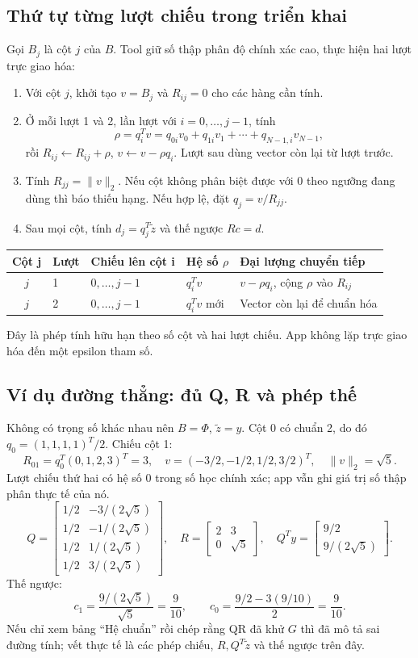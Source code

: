 \subsection{Thứ tự từng lượt chiếu trong triển khai}
Gọi $B_j$ là cột $j$ của $B$. Tool giữ số thập phân độ chính xác cao, thực hiện hai lượt trực giao hóa:
\begin{enumerate}
\item Với cột $j$, khởi tạo $v=B_j$ và $R_{ij}=0$ cho các hàng cần tính.
\item Ở mỗi lượt 1 và 2, lần lượt với $i=0,\ldots,j-1$, tính
\[
\rho=q_i^Tv=q_{0i}v_0+q_{1i}v_1+\cdots+q_{N-1,i}v_{N-1},
\]
rồi $R_{ij}\leftarrow R_{ij}+\rho$, $v\leftarrow v-\rho q_i$. Lượt sau dùng vector còn lại từ lượt trước.
\item Tính $R_{jj}=\|v\|_2$. Nếu cột không phân biệt được với 0 theo ngưỡng đang dùng thì báo thiếu hạng. Nếu hợp lệ, đặt $q_j=v/R_{jj}$.
\item Sau mọi cột, tính $d_j=q_j^T\widetilde z$ và thế ngược $Rc=d$.
\end{enumerate}
\begin{center}\small\begin{tabular}{cllll}\toprule
Cột j&Lượt&Chiếu lên cột i&Hệ số $\rho$&Đại lượng chuyển tiếp\\\midrule
$j$&1&$0,\ldots,j-1$&$q_i^Tv$&$v-\rho q_i$, cộng $\rho$ vào $R_{ij}$\\
$j$&2&$0,\ldots,j-1$&$q_i^Tv$ mới&Vector còn lại để chuẩn hóa\\\bottomrule
\end{tabular}\end{center}
Đây là phép tính hữu hạn theo số cột và hai lượt chiếu. App không lặp trực giao hóa đến một epsilon tham số.

\subsection{Ví dụ đường thẳng: đủ Q, R và phép thế}
Không có trọng số khác nhau nên $B=\Phi$, $\widetilde z=y$. Cột 0 có chuẩn 2, do đó $q_0=(1,1,1,1)^T/2$. Chiếu cột 1:
\[
R_{01}=q_0^T(0,1,2,3)^T=3,\quad
v=(-3/2,-1/2,1/2,3/2)^T,\quad\|v\|_2=\sqrt5.
\]
Lượt chiếu thứ hai có hệ số 0 trong số học chính xác; app vẫn ghi giá trị số thập phân thực tế của nó.
\[
Q=\begin{bmatrix}
1/2&-3/(2\sqrt5)\\1/2&-1/(2\sqrt5)\\
1/2&1/(2\sqrt5)\\1/2&3/(2\sqrt5)
\end{bmatrix},\quad
R=\begin{bmatrix}2&3\\0&\sqrt5\end{bmatrix},\quad
Q^Ty=\begin{bmatrix}9/2\\9/(2\sqrt5)\end{bmatrix}.
\]
Thế ngược:
\[
c_1=\frac{9/(2\sqrt5)}{\sqrt5}=\frac9{10},\qquad
c_0=\frac{9/2-3(9/10)}2=\frac9{10}.
\]
Nếu chỉ xem bảng ``Hệ chuẩn'' rồi chép rằng QR đã khử $G$ thì đã mô tả sai đường tính; vết thực tế là các phép chiếu, $R,Q^T\widetilde z$ và thế ngược trên đây.

